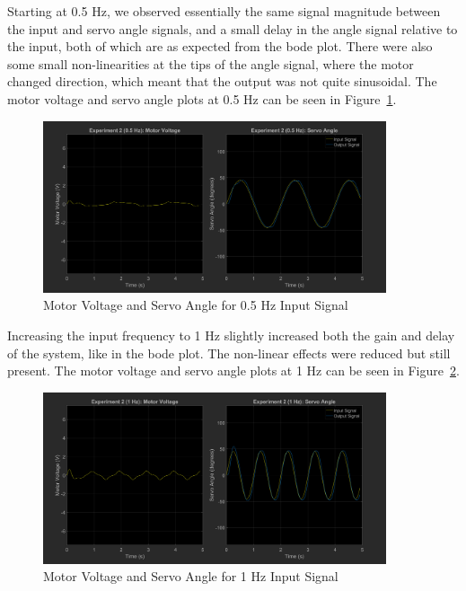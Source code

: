 \documentclass[12pt]{article}
\begin{document}
Starting at 0.5 Hz, we observed essentially the same signal magnitude between the input and servo angle signals, and a small delay in the angle signal relative to the input, both of which are as expected from the bode plot. There were also some small non-linearities at the tips of the angle signal, where the motor changed direction, which meant that the output was not quite sinusoidal. The motor voltage and servo angle plots at 0.5 Hz can be seen in Figure~\ref{fig:exp2_0.5}.
\begin{figure}[h!]
    \centering
    \includegraphics[width=0.9\textwidth]{exp2_0.5}
    \caption{\label{fig:exp2_0.5}Motor Voltage and Servo Angle for 0.5 Hz Input Signal}
\end{figure}

Increasing the input frequency to 1 Hz slightly increased both the gain and delay of the system, like in the bode plot. The non-linear effects were reduced but still present. The motor voltage and servo angle plots at 1 Hz can be seen in Figure~\ref{fig:exp2_1}.
\begin{figure}[h!]
    \centering
    \includegraphics[width=0.9\textwidth]{exp2_1}
    \caption{\label{fig:exp2_1}Motor Voltage and Servo Angle for 1 Hz Input Signal}
\end{figure}
\end{document}
